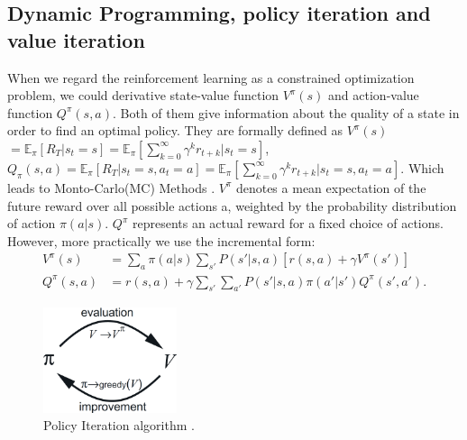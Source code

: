 \subsection{Dynamic Programming, policy iteration and value iteration}
When we regard the reinforcement learning as a constrained optimization problem, we could derivative state-value function $V^{\pi}(s)$ and action-value function $Q^{\pi}(s, a)    $\cite{gordon1999approximate}\cite{puterman2014markov}. Both of them give information about the quality of a state in order to find an optimal policy. They are formally defined as 
$V^\pi (s)$  $ = \mathbb{E}_\pi [ R_T \vert s_t = s] = \mathbb{E}_\pi [ {\sum_{k=0}^{\infty}\gamma^k r_{t+k} \vert s_t = s} ] \label{equ:origin:V}$, 
$Q_\pi(s, a) = \mathbb{E}_\pi [R_T \vert s_t = s, a_t = a] =  \mathbb{E}_\pi [ {\sum_{k=0}^{\infty}\gamma^k r_{t+k} \vert s_t = s, a_t = a} ] \label{equ:origin:Q}
$. Which leads to Monto-Carlo(MC) Methods \cite{boyan1999least}. 
$V^\pi$ denotes a mean expectation of the future reward over all possible actions a, weighted by the probability distribution of action $\pi(a|s)$. $Q^\pi$
represents an actual reward for a fixed choice of actions.
However, more practically we use the incremental form: 
\begin{align}
V^\pi(s) &= \sum_a \pi(a \vert s) \sum_{s'} P(s' \vert s, a) [r(s, a) + \gamma V^{\pi}(s')] \label{equ:V} \\
Q^\pi(s, a) &= r(s, a) + \gamma \sum_{s'} \sum_{a'} P(s' \vert s, a) \pi(a' \vert s') Q^\pi(s', a'). \label{equ:Q}
\end{align} 
\begin{figure}	
	\centering
	\vspace{-15pt}
	\includegraphics[width=0.35\textwidth]{pic/PI}
	\vspace{-15pt}
	\caption{Policy Iteration algorithm  \cite{sutton1998introduction}.}
	\vspace{ -15pt}
	\label{fig:PI}
\end{figure}
